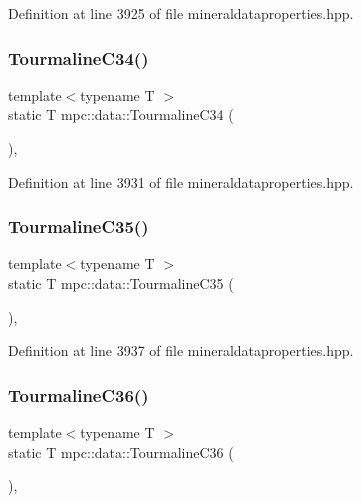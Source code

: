 Definition at line 3925 of file mineraldataproperties.\+hpp.

\mbox{\label{namespacempc_1_1data_aa5425a8533b2e1a4b43982db19637e68}} 
\subsubsection{\texorpdfstring{Tourmaline\+C34()}{TourmalineC34()}}
{\footnotesize\ttfamily template$<$typename T $>$ \\
static T mpc\+::data\+::\+Tourmaline\+C34 (\begin{DoxyParamCaption}{ }\end{DoxyParamCaption})\hspace{0.3cm}{\ttfamily [inline]}, {\ttfamily [static]}}



Definition at line 3931 of file mineraldataproperties.\+hpp.

\mbox{\label{namespacempc_1_1data_ae767b00ff020e7423643e3a97966e53d}} 
\subsubsection{\texorpdfstring{Tourmaline\+C35()}{TourmalineC35()}}
{\footnotesize\ttfamily template$<$typename T $>$ \\
static T mpc\+::data\+::\+Tourmaline\+C35 (\begin{DoxyParamCaption}{ }\end{DoxyParamCaption})\hspace{0.3cm}{\ttfamily [inline]}, {\ttfamily [static]}}



Definition at line 3937 of file mineraldataproperties.\+hpp.

\mbox{\label{namespacempc_1_1data_aa01502f87728f813beae59113f16879e}} 
\subsubsection{\texorpdfstring{Tourmaline\+C36()}{TourmalineC36()}}
{\footnotesize\ttfamily template$<$typename T $>$ \\
static T mpc\+::data\+::\+Tourmaline\+C36 (\begin{DoxyParamCaption}{ }\end{DoxyParamCaption})\hspace{0.3cm}{\ttfamily [inline]}, {\ttfamily [static]}}



